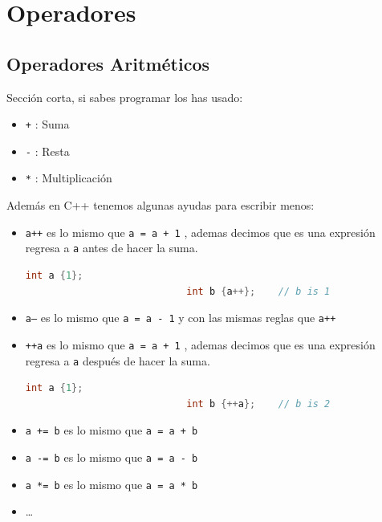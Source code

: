\documentclass[12pt, fleqn]{report}                             %
\theoremstyle{break}                                            %
\newcommand{\textCode}[1]  { \texttt{#1} }                      %
\begin{document}
        \section{Operadores}

            \subsection{Operadores Aritméticos}

                Sección corta, si sabes programar los has usado:

                \begin{itemize}
                    \item \textCode{+}: Suma
                    \item \textCode{-}: Resta
                    \item \textCode{*}: Multiplicación
                \end{itemize}

                Además en C++ tenemos algunas ayudas para escribir menos:
                \begin{itemize}
                    \item \textCode{a++} es lo mismo que \textCode{a = a + 1}, ademas 
                        decimos que es una expresión regresa a \textCode{a} antes de hacer la suma.
                        \begin{lstlisting}[language=C++, gobble=28]
                            int a {1};
                            int b {a++};    // b is 1
                        \end{lstlisting}
                    \item \textCode{a---} es lo mismo que \textCode{a = a - 1} y con las mismas reglas que \textCode{a++}
                    \item \textCode{++a} es lo mismo que \textCode{a = a + 1}, ademas 
                        decimos que es una expresión regresa a \textCode{a} después de hacer la suma.
                        \begin{lstlisting}[language=C++, gobble=28]
                            int a {1};
                            int b {++a};    // b is 2
                        \end{lstlisting}
                    \item \textCode{a += b} es lo mismo que \textCode{a = a + b}
                    \item \textCode{a -= b} es lo mismo que \textCode{a = a - b}
                    \item \textCode{a *= b} es lo mismo que \textCode{a = a * b}
                    \item \dots
                \end{itemize}
\end{document}
